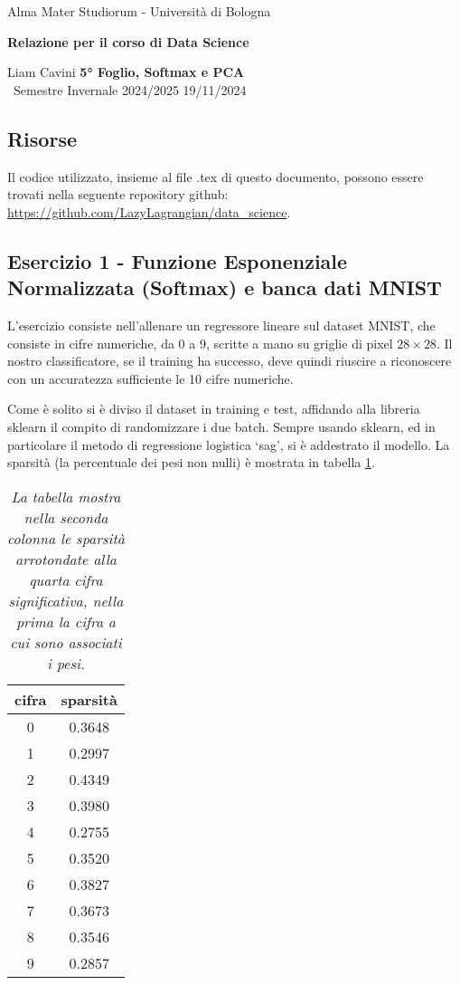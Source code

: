 \documentclass{article}
\begin{document}
\begin{center}
    {\Large Alma Mater Studiorum - Università di Bologna}
    
    \vspace{0.5cm}
    {\bf \large Relazione per il corso di Data Science}
\end{center} 

\noindent
{ Liam Cavini} \hfill {\bf 5° Foglio, Softmax e PCA}\\
{\ Semestre Invernale 2024/2025} \hfill 19/11/2024

\subsection*{Risorse}
Il codice utilizzato, insieme al file .tex di questo documento, possono essere trovati nella seguente repository github: \url{https://github.com/LazyLagrangian/data_science}.

\subsection*{Esercizio 1 - Funzione Esponenziale Normalizzata (Softmax) e banca dati MNIST}
L'esercizio consiste nell'allenare un regressore lineare sul dataset MNIST, che consiste in cifre numeriche, da 0 a 9, scritte a mano su griglie di pixel $28 \times 28$.
Il nostro classificatore, se il training ha successo, deve quindi riuscire a riconoscere con un accuratezza sufficiente le 10 cifre numeriche.

Come è solito si è diviso il dataset in training e test, affidando alla libreria sklearn il compito di randomizzare i due batch. Sempre usando sklearn, ed in particolare il metodo di regressione logistica `sag', si è addestrato il modello.
La sparsità (la percentuale dei pesi non nulli) è mostrata in tabella \ref{tab:sparsità}.

\begin{table}[htb]
    \centering
\begin{tabular}[]{|c|c|}
    \hline
    cifra & sparsità\\ \hline
    0 & 0.3648 \\ \hline
    1 & 0.2997 \\ \hline
    2 & 0.4349 \\ \hline
    3 & 0.3980 \\ \hline
    4 & 0.2755 \\ \hline
    5 & 0.3520 \\ \hline
    6 & 0.3827 \\ \hline
    7 & 0.3673 \\ \hline
    8 & 0.3546 \\ \hline
    9 & 0.2857 \\ \hline
\end{tabular}
\caption{\emph{La tabella mostra nella seconda colonna le sparsità arrotondate alla quarta cifra significativa, nella prima la cifra a cui sono associati i pesi.}}
\label{tab:sparsità}
\end{table}
\end{document}
